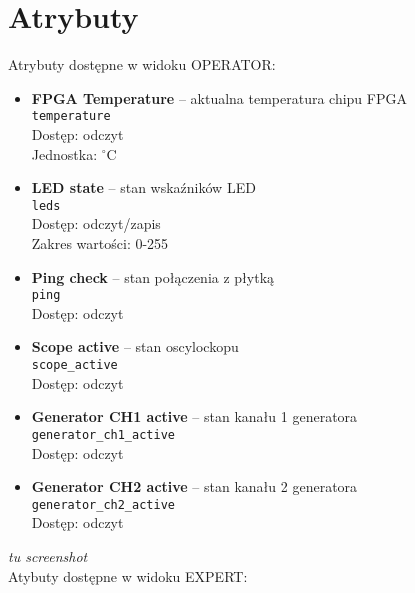 \documentclass[12pt,a4paper]{article}
\begin{document}
	\section{Atrybuty}
	Atrybuty dostępne w widoku OPERATOR:
	\begin{itemize}
		\item \textbf{FPGA Temperature} -- aktualna temperatura chipu FPGA\\
			  \texttt{temperature}\\
			  Dostęp: odczyt\\
			  Jednostka: $^{\circ}$C
		\item \textbf{LED state} -- stan wskaźników LED\\
			  \texttt{leds}\\
			  Dostęp: odczyt/zapis\\
			  Zakres wartości: 0-255
		\item \textbf{Ping check} -- stan połączenia z płytką\\
			  \texttt{ping}\\
			  Dostęp: odczyt
		\item \textbf{Scope active} -- stan oscylockopu\\
			  \texttt{scope\_active}\\
			  Dostęp: odczyt
		\item \textbf{Generator CH1 active} -- stan kanału 1 generatora\\
			  \texttt{generator\_ch1\_active}\\
			  Dostęp: odczyt
		\item \textbf{Generator CH2 active} -- stan kanału 2 generatora\\
			  \texttt{generator\_ch2\_active}\\
			  Dostęp: odczyt
	\end{itemize}
	\emph{tu screenshot}\\
	Atybuty dostępne w widoku EXPERT:
\end{document}
